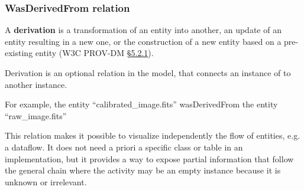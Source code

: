 \subsubsection{WasDerivedFrom relation}

A \textbf{derivation} is a transformation of an entity into another, an update of an entity resulting in a new one, or the construction of a new entity based on a pre-existing entity (W3C PROV-DM \href{https://www.w3.org/TR/prov-dm/#term-Derivation}{\S5.2.1}).

Derivation is an optional relation  in the model, that connects an instance of  to another instance.

For example, the entity ``calibrated\_image.fits'' wasDerivedFrom the entity ``raw\_image.fits''

This relation makes it possible to visualize independently the flow of entities, e.g. a dataflow. It does not need a priori a specific class or table in an implementation, but it provides a way to expose partial information that follow the general chain  where the activity may be an empty instance because it is unknown or irrelevant.




